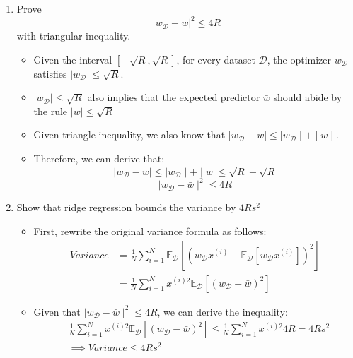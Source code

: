 \documentclass{article}
\theoremstyle{definition}
\theoremstyle{remark}
\begin{document}
\begin{enumerate}[font={\Large\bfseries},left=0pt]
\begin{enumerate}
		\item Prove $$|w_{\mathcal{D}} - \bar{w}|^2 \leq 4R$$ with triangular inequality.
		      \begin{itemize}
			      \item Given the interval $\left[-\sqrt{R}, \sqrt{R}\right]$, for every dataset $\mathcal{D}$, the optimizer $w_\mathcal{D}$ satisfies $\mid w_\mathcal{D} \mid \le \sqrt{R}$.
			      \item  $\mid w_\mathcal{D} \mid \le \sqrt{R}$ also implies that the expected predictor $\bar{w}$ should abide by the rule $\mid \bar{w}\mid \le \sqrt{R}$
			      \item Given triangle inequality, we also know that $\mid w_\mathcal{D} - \bar{w} \mid \le \mid w_\mathcal{D} \mid + \mid \bar{w} \mid$.
			      \item Therefore, we can derive that:
			            $$
				            \mid w_\mathcal{D} - \bar{w} \mid \le \mid w_\mathcal{D} \mid + \mid \bar{w} \mid \le \sqrt{R} + \sqrt{R}
			            $$
			            $$
				            \mid w_\mathcal{D} - \bar{w} \mid^2 \le 4R
			            $$
		      \end{itemize}

		\item Show that ridge regression bounds the variance by $4Rs^2$
		      \begin{itemize}
			      \item First, rewrite the original variance formula as follows:
			            \begin{align}
				            Variance & = \frac{1}{N} \sum_{i=1}^N \mathbb{E}_{\mathcal{D}} \left[(w_{\mathcal{D}}x^{(i)} - \mathbb{E}_{\mathcal{D}}[w_{\mathcal{D}} x^{(i)}])^2\right] \\
				                     & = \frac{1}{N} \sum_{i=1}^N x^{(i)2}\mathbb{E}_{\mathcal{D}} \left[(w_{\mathcal{D}} - \bar{w})^2\right]
			            \end{align}
			      \item Given that $\mid w_\mathcal{D} - \bar{w} \mid^2 \le 4R$, we can derive the inequality:
			            \begin{align}
				             & \frac{1}{N} \sum_{i=1}^N x^{(i)2}\mathbb{E}_{\mathcal{D}} \left[(w_{\mathcal{D}} - \bar{w})^2\right]
				            \le \frac{1}{N} \sum_{i=1}^N x^{(i)2} 4R
				            = 4Rs^2                                                                                                 \\
				             & \implies Variance \le 4Rs^2
			            \end{align}
		      \end{itemize}


\end{enumerate}
\end{enumerate}
\end{document}
